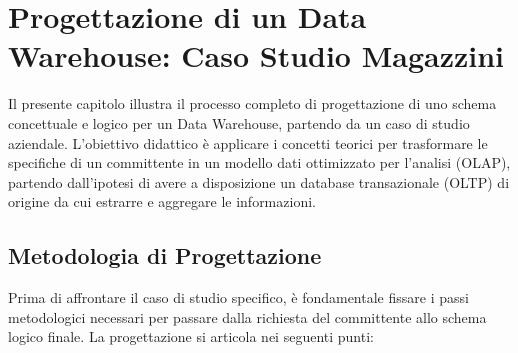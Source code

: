 \chapter{Progettazione di un Data Warehouse: Caso Studio Magazzini}

Il presente capitolo illustra il processo completo di progettazione di uno schema concettuale e logico per un Data Warehouse, partendo da un caso di studio aziendale. L'obiettivo didattico è applicare i concetti teorici per trasformare le specifiche di un committente in un modello dati ottimizzato per l'analisi (OLAP), partendo dall'ipotesi di avere a disposizione un database transazionale (OLTP) di origine da cui estrarre e aggregare le informazioni.

\section{Metodologia di Progettazione}

Prima di affrontare il caso di studio specifico, è fondamentale fissare i passi metodologici necessari per passare dalla richiesta del committente allo schema logico finale. La progettazione si articola nei seguenti punti:

